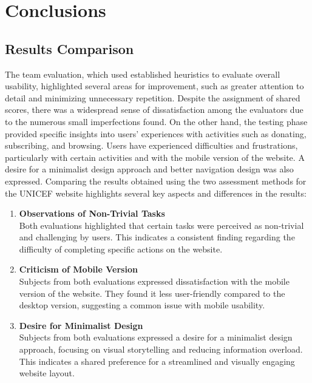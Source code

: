 \section{Conclusions}

\subsection{Results Comparison}
The team evaluation, which used established heuristics to evaluate overall usability, highlighted several areas for improvement, such as greater attention to detail and minimizing unnecessary repetition.
Despite the assignment of shared scores, there was a widespread sense of dissatisfaction among the evaluators due to the numerous small imperfections found.
On the other hand, the testing phase provided specific insights into users' experiences with activities such as donating, subscribing, and browsing.
Users have experienced difficulties and frustrations, particularly with certain activities and with the mobile version of the website.
A desire for a minimalist design approach and better navigation design was also expressed.
Comparing the results obtained using the two assessment methods for the UNICEF website highlights several key aspects and differences in the results:\\

\textbf{\color{unicefGreen}{Similiarties}}
\begin{enumerate}
\item \textbf{Observations of Non-Trivial Tasks} \\
Both evaluations highlighted that certain tasks were perceived as non-trivial and challenging by users. 
This indicates a consistent finding regarding the difficulty of completing specific actions on the website.

\item \textbf{Criticism of Mobile Version} \\
Subjects from both evaluations expressed dissatisfaction with the mobile version of the website. 
They found it less user-friendly compared to the desktop version, suggesting a common issue with mobile usability.

\item \textbf{Desire for Minimalist Design} \\
Subjects from both evaluations expressed a desire for a minimalist design approach, focusing on visual storytelling and reducing information overload. 
This indicates a shared preference for a streamlined and visually engaging website layout.
\end{enumerate}

